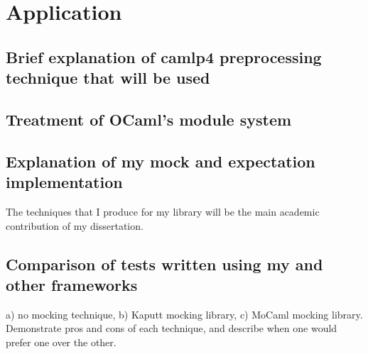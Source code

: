 \chapter{Application}
\label{application}

\section{Brief explanation of camlp4 preprocessing technique that will be used}

\section{Treatment of OCaml's module system}

\section{Explanation of my mock and expectation implementation}

The techniques that I produce for my library will be the main academic
contribution of my dissertation.

\section{Comparison of tests written using my and other frameworks}

a) no mocking technique, b) Kaputt mocking library, c) MoCaml mocking
library. Demonstrate pros and cons of each technique, and describe
when one would prefer one over the other.
